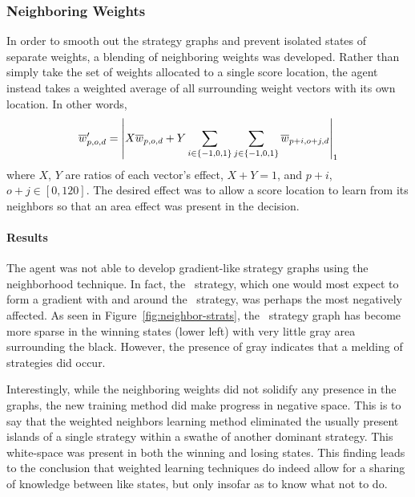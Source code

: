 

\subsubsection*{Neighboring Weights}
\label{sec:findings-expts-neighbors}


In order to smooth out the strategy graphs
and prevent isolated states of separate weights,
a blending of neighboring weights was developed.
%
Rather than simply take the set of weights allocated to a single score location,
the agent instead takes a weighted average of all surrounding weight vectors
with its own location.
%
In other words,
\[
    \wvecm'_{p,o,d} = %
    \left|
    X\wvecm_{p,o,d} +
    Y \sum_{i\in\{-1,0,1\}} \sum_{j\in\{-1,0,1\}} \wvecm_{p+i,o+j,d}
    \right|_1
\]
where $X$, $Y$ are ratios of each vector's effect, $X+Y = 1$,
and $p+i$, $o+j \in [0,120]$.
%
The desired effect was to allow a score location to learn from its neighbors
so that an area effect was present in the decision.


\paragraph*{Results}





The agent was not
able to develop gradient-like strategy graphs
using the neighborhood technique.
%
In fact,
the \handmaxavg\ strategy,
which one would most expect to form a gradient with and around the
\handmaxmin\ strategy,
was perhaps the most negatively affected.
%
As seen in Figure~\ref{fig:neighbor-strats},
the \handmaxavg\ strategy graph has become more sparse in the winning
states (lower left)
with very little gray area surrounding the black.
%
However,
the presence of gray
indicates that a melding of strategies did occur.

Interestingly,
while the neighboring weights did not solidify any presence in the graphs,
the new training method did make progress in negative space.
%
This is to say that
the weighted neighbors learning method eliminated the usually present islands
of a single strategy within a swathe of another dominant strategy.
%
This white-space was present in both the winning and losing states.
%
This finding leads to the conclusion that weighted learning techniques
do indeed allow for a sharing of knowledge between like states,
but only insofar as to know what not to do.

